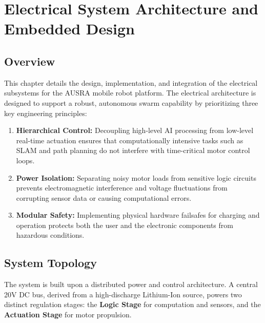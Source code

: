 
\chapter{Electrical System Architecture and Embedded Design}
\label{chap:electrical}

\section{Overview}
\label{sec:electrical_overview}

This chapter details the design, implementation, and integration of the electrical subsystems for the AUSRA mobile robot platform. The electrical architecture is designed to support a robust, autonomous swarm capability by prioritizing three key engineering principles:

\begin{enumerate}
    \item \textbf{Hierarchical Control:} Decoupling high-level AI processing from low-level real-time actuation ensures that computationally intensive tasks such as SLAM and path planning do not interfere with time-critical motor control loops.
    \item \textbf{Power Isolation:} Separating noisy motor loads from sensitive logic circuits prevents electromagnetic interference and voltage fluctuations from corrupting sensor data or causing computational errors.
    \item \textbf{Modular Safety:} Implementing physical hardware failsafes for charging and operation protects both the user and the electronic components from hazardous conditions.
\end{enumerate}

\section{System Topology}
\label{sec:system_topology}

The system is built upon a distributed power and control architecture. A central 20V DC bus, derived from a high-discharge Lithium-Ion source, powers two distinct regulation stages: the \textbf{Logic Stage} for computation and sensors, and the \textbf{Actuation Stage} for motor propulsion.

